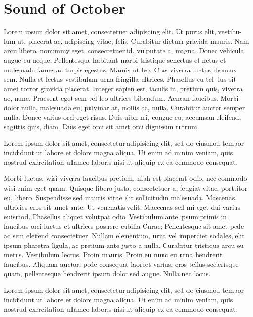 \section{Sound of October}
Lorem ipsum dolor sit amet, consectetuer adipiscing elit. Ut purus elit, vestibu-
lum ut, placerat ac, adipiscing vitae, felis. Curabitur dictum gravida mauris.
Nam arcu libero, nonummy eget, consectetuer id, vulputate a, magna. Donec
vehicula augue eu neque. Pellentesque habitant morbi tristique senectus et
netus et malesuada fames ac turpis egestas. Mauris ut leo. Cras viverra metus
rhoncus sem. Nulla et lectus vestibulum urna fringilla ultrices. Phasellus eu tel-
lus sit amet tortor gravida placerat. Integer sapien est, iaculis in, pretium quis,
viverra ac, nunc. Praesent eget sem vel leo ultrices bibendum. Aenean faucibus.
Morbi dolor nulla, malesuada eu, pulvinar at, mollis ac, nulla. Curabitur auctor
semper nulla. Donec varius orci eget risus. Duis nibh mi, congue eu, accumsan
eleifend, sagittis quis, diam. Duis eget orci sit amet orci dignissim rutrum.
\begin{aside}[Remark:]
  Lorem ipsum dolor sit amet, consectetur adipisicing elit, sed do eiusmod
  tempor incididunt ut labore et dolore magna aliqua. Ut enim ad minim veniam,
  quis nostrud exercitation ullamco laboris nisi ut aliquip ex ea commodo
  consequat.
\end{aside}

Morbi luctus, wisi viverra faucibus pretium, nibh est placerat odio, nec commodo
wisi enim eget quam. Quisque libero justo, consectetuer a, feugiat vitae, porttitor
eu, libero. Suspendisse sed mauris vitae elit sollicitudin malesuada. Maecenas
ultricies eros sit amet ante. Ut venenatis velit. Maecenas sed mi eget dui varius
euismod. Phasellus aliquet volutpat odio. Vestibulum ante ipsum primis in
faucibus orci luctus et ultrices posuere cubilia Curae; Pellentesque sit amet pede
ac sem eleifend consectetuer. Nullam elementum, urna vel imperdiet sodales, elit
ipsum pharetra ligula, ac pretium ante justo a nulla. Curabitur tristique arcu
eu metus. Vestibulum lectus. Proin mauris. Proin eu nunc eu urna hendrerit
faucibus. Aliquam auctor, pede consequat laoreet varius, eros tellus scelerisque
quam, pellentesque hendrerit ipsum dolor sed augue. Nulla nec lacus.
\begin{textbox}[lightgray]
  Lorem ipsum dolor sit amet, consectetur adipisicing elit, sed do eiusmod
  tempor incididunt ut labore et dolore magna aliqua. Ut enim ad minim veniam,
  quis nostrud exercitation ullamco laboris nisi ut aliquip ex ea commodo
  consequat.
\end{textbox}

